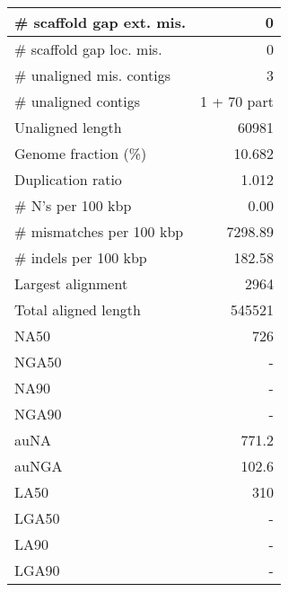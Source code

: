 \documentclass[12pt,a4paper]{article}
\begin{document}
\begin{table}[ht]
\begin{center}
\begin{tabular}{|l*{1}{|r}|}
\# scaffold gap ext. mis. & 0 \\ \hline
\# scaffold gap loc. mis. & 0 \\ \hline
\# unaligned mis. contigs & 3 \\ \hline
\# unaligned contigs & 1 + 70 part \\ \hline
Unaligned length & 60981 \\ \hline
Genome fraction (\%) & 10.682 \\ \hline
Duplication ratio & 1.012 \\ \hline
\# N's per 100 kbp & 0.00 \\ \hline
\# mismatches per 100 kbp & 7298.89 \\ \hline
\# indels per 100 kbp & 182.58 \\ \hline
Largest alignment & 2964 \\ \hline
Total aligned length & 545521 \\ \hline
NA50 & 726 \\ \hline
NGA50 & - \\ \hline
NA90 & - \\ \hline
NGA90 & - \\ \hline
auNA & 771.2 \\ \hline
auNGA & 102.6 \\ \hline
LA50 & 310 \\ \hline
LGA50 & - \\ \hline
LA90 & - \\ \hline
LGA90 & - \\ \hline
\end{tabular}
\end{center}
\end{table}
\end{document}
